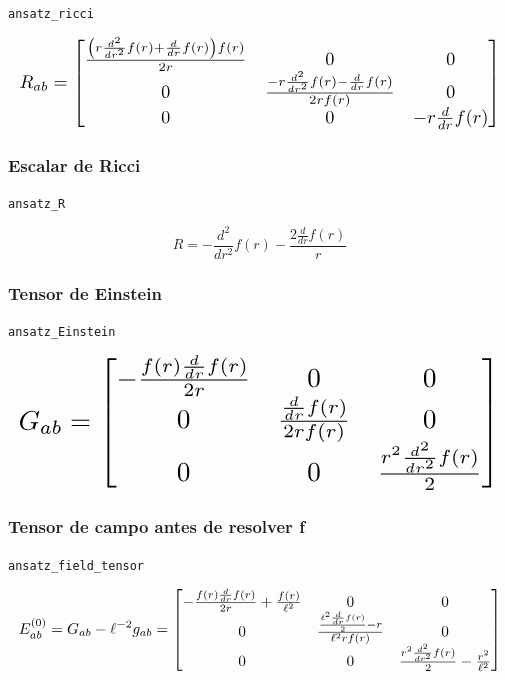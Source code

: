 \documentclass[11pt,a4paper]{article}
\begin{document}
\noindent\texttt{ansatz\_ricci}\par\nopagebreak[4]

\[
\resizebox{\textwidth}{!}{$\displaystyle R_{ab} = \left[\begin{matrix}\frac{\left(r \frac{d^{2}}{d r^{2}} f{\left(r \right)} + \frac{d}{d r} f{\left(r \right)}\right) f{\left(r \right)}}{2 r} & 0 & 0\\0 & \frac{- r \frac{d^{2}}{d r^{2}} f{\left(r \right)} - \frac{d}{d r} f{\left(r \right)}}{2 r f{\left(r \right)}} & 0\\0 & 0 & - r \frac{d}{d r} f{\left(r \right)}\end{matrix}\right]$}
\]

\subsubsection{Escalar de Ricci}

\noindent\texttt{ansatz\_R}\par\nopagebreak[4]

\[
R = - \frac{d^{2}}{d r^{2}} f{\left(r \right)} - \frac{2 \frac{d}{d r} f{\left(r \right)}}{r}
\]

\subsubsection{Tensor de Einstein}

\noindent\texttt{ansatz\_Einstein}\par\nopagebreak[4]

\[
\resizebox{\textwidth}{!}{$\displaystyle G_{ab} = \left[\begin{matrix}- \frac{f{\left(r \right)} \frac{d}{d r} f{\left(r \right)}}{2 r} & 0 & 0\\0 & \frac{\frac{d}{d r} f{\left(r \right)}}{2 r f{\left(r \right)}} & 0\\0 & 0 & \frac{r^{2} \frac{d^{2}}{d r^{2}} f{\left(r \right)}}{2}\end{matrix}\right]$}
\]

\subsubsection{Tensor de campo antes de resolver f}

\noindent\texttt{ansatz\_field\_tensor}\par\nopagebreak[4]

\[
\resizebox{\textwidth}{!}{$\displaystyle E^{(0)}_{ab}=G_{ab}-\ell^{-2}g_{ab} = \left[\begin{matrix}- \frac{f{\left(r \right)} \frac{d}{d r} f{\left(r \right)}}{2 r} + \frac{f{\left(r \right)}}{\ell^{2}} & 0 & 0\\0 & \frac{\frac{\ell^{2} \frac{d}{d r} f{\left(r \right)}}{2} - r}{\ell^{2} r f{\left(r \right)}} & 0\\0 & 0 & \frac{r^{2} \frac{d^{2}}{d r^{2}} f{\left(r \right)}}{2} - \frac{r^{2}}{\ell^{2}}\end{matrix}\right]$}
\]
\end{document}
